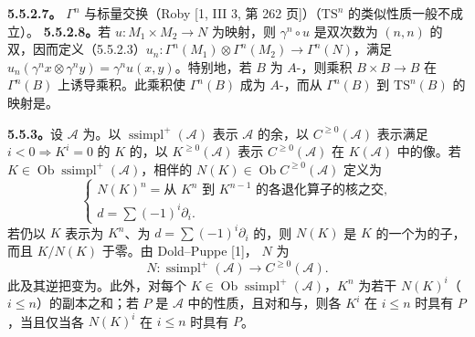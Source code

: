 \textbf{5.5.2.7。} $\Gamma^n$ 与标量交换（Roby [1, III 3, 第 262 页]）（$\mathrm{TS}^n$ 的类似性质一般不成立）。
\textbf{5.5.2.8。}若 $u:M_1\times M_2\to N$ 为映射，则 $\gamma^n\circ u$ 是双次数为 $(n,n)$ 的双，因而定义（5.5.2.3）$u_n:\Gamma^n(M_1)\otimes\Gamma^n(M_2)\to\Gamma^n(N)$，满足 $u_n(\gamma^nx\otimes\gamma^ny)=\gamma^nu(x,y)$。特别地，若 $B$ 为 $A$-，则乘积 $B\times B\to B$ 在 $\Gamma^n(B)$ 上诱导乘积。此乘积使 $\Gamma^n(B)$ 成为 $A$-，而从 $\Gamma^n(B)$ 到 $\mathrm{TS}^n(B)$ 的映射是。

\textbf{5.5.3。}设 $\mathscr A$ 为。以 $\operatorname{ssimpl}^+(\mathscr A)$ 表示 $\mathscr A$ 的余，以 $C^{\geq0}(\mathscr A)$ 表示满足 $i<0\Rightarrow K^i=0$ 的 $K$ 的，以 $K^{\geq0}(\mathscr A)$ 表示 $C^{\geq0}(\mathscr A)$ 在 $K(\mathscr A)$ 中的像。若 $K\in\operatorname{Ob}\operatorname{ssimpl}^+(\mathscr A)$，相伴的 $N(K)\in\operatorname{Ob}C^{\geq0}(\mathscr A)$ 定义为
\begin{equation}\tag{5.5.3.1}\begin{cases}
N(K)^n=\text{从 }K^n\text{ 到 }K^{n-1}\text{ 的各退化算子的核之交},\\
d=\sum(-1)^i\partial_i.
\end{cases}\end{equation}
若仍以 $K$ 表示为 $K^n$、为 $d=\sum(-1)^i\partial_i$ 的，则 $N(K)$ 是 $K$ 的一个为的子，而且 $K/N(K)$ 于零。由 Dold--Puppe [1]， $N$ 为
\[N:\operatorname{ssimpl}^+(\mathscr A)\longrightarrow C^{\geq0}(\mathscr A).\]
此及其逆把变为。此外，对每个 $K\in\operatorname{Ob}\operatorname{ssimpl}^+(\mathscr A)$，$K^n$ 为若干 $N(K)^i$（$i\leq n$）的副本之和；若 $P$ 是 $\mathscr A$ 中的性质，且对和与，则各 $K^i$ 在 $i\leq n$ 时具有 $P$，当且仅当各 $N(K)^i$ 在 $i\leq n$ 时具有 $P$。

